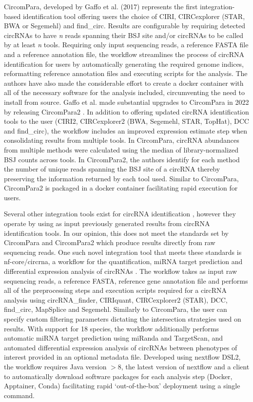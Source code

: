 \documentclass[journal,review,submit,pdftex,moreauthors]{Definitions/mdpi}
\begin{document}
CircomPara, developed by Gaffo et al. (2017) \cite{CirComPara} represents the first integration-based identification tool offering users the choice of CIRI, CIRCexplorer (STAR, BWA or Segemehl) and find\_circ. Results are configurable by requiring detected circRNAs to have \textit{n} reads spanning their BSJ site and/or circRNAs to be called by at least \textit{n} tools. Requiring only input sequencing reads, a reference FASTA file and a reference annotation file, the workflow streamlines the process of circRNA identification for users by automatically generating the required genome indices, reformatting reference annotation files and executing scripts for the analysis. The authors have also made the considerable effort to create a docker container with all of the necessary software for the analysis included, circumventing the need to install from source. Gaffo et al. made substantial upgrades to CircomPara in 2022 by releasing CircomPara2 \cite{CirComPara2}. In addition to offering updated circRNA identification tools to the user (CIRI2, CIRCexplorer2 (BWA, Segemehl, STAR, TopHat), DCC and find\_circ), the workflow includes an improved expression estimate step when consolidating results from multiple tools. In CircomPara, circRNA abundances from multiple methods were calculated using the median of library-normalized BSJ counts across tools. In CircomPara2, the authors identify for each method the number of unique reads spanning the BSJ site of a circRNA thereby preserving the information returned by each tool used. Similar to CircomPara, CircomPara2 is packaged in a docker container facilitating rapid execution for users. \par
Several other integration tools exist for circRNA identification \cite{circRNAwrap, DEBKS, circmeta, circRNAprofiler, FcircSEC}, however they operate by using as input previously generated results from circRNA identification tools. In our opinion, this does not meet the standards set by CircomPara and CircomPara2 which produce results directly from raw sequencing reads. One such novel integration tool that meets these standards is nf-core/circrna, a workflow for the quantification, miRNA target prediction and differential expression analysis of circRNAs \cite{Digby2023Dec}. The workflow takes as input raw sequencing reads, a reference FASTA, reference gene annotation file and performs all of the preprocessing steps and execution scripts required for a circRNA analysis using circRNA\_finder, CIRIquant, CIRCexplorer2 (STAR), DCC, find\_circ, MapSplice and Segemehl. Similarly to CircomPara, the user can specify custom filtering parameters dictating the intersection strategies used on results. With support for 18 species, the workflow additionally performs automatic miRNA target prediction using miRanda and TargetScan, and automated differential expression analysis of circRNAs between phenotypes of interest provided in an optional metadata file. Developed using nextflow DSL2, the workflow requires Java version $>$8, the latest version of nextflow and a client to automatically download software packages for each analysis step (Docker, Apptainer, Conda) facilitating rapid `out-of-the-box' deployment using a single command.
\end{document}
